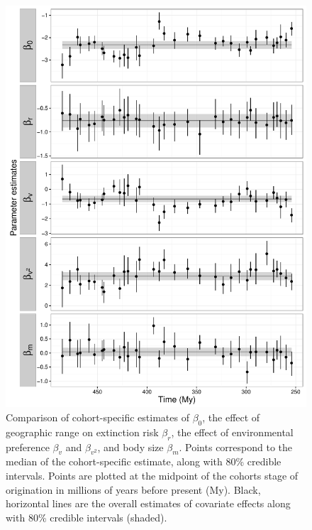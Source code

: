 \documentclass{article}
\begin{document}
\begin{figure}[ht]
  \centering
  \includegraphics[width = \textwidth,height = \textheight,keepaspectratio=true]{figure/cohort_series}
  \caption{Comparison of cohort-specific estimates of \(\beta_{0}\), the effect of geographic range on extinction risk \(\beta_{r}\), the effect of environmental preference \(\beta_{v}\) and \(\beta_{v^{2}}\), and body size \(\beta_{m}\). Points correspond to the median of the cohort-specific estimate, along with 80\% credible intervals. Points are plotted at the midpoint of the cohorts stage of origination in millions of years before present (My). Black, horizontal lines are the overall estimates of covariate effects along with 80\% credible intervals (shaded).}
  \label{fig:cohort_series}
\end{figure}
\end{document}
